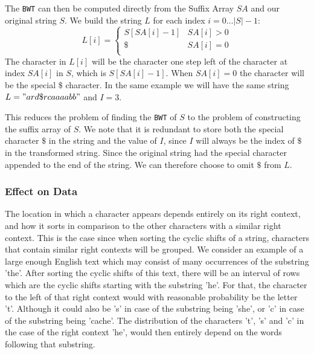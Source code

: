 \documentclass{article}
\begin{document}
The \texttt{BWT} can then be computed directly from the Suffix Array \(SA\) and our original string \(S\). We build the string \(L\) for each index \(i = 0 \dots |S|-1\):
\[
    L[i] = \begin{cases} 
        S[SA[i] - 1] & SA[i] > 0 \\
        \$ & SA[i] = 0 \\
   \end{cases}
\]
The character in \(L[i]\) will be the character one step left of the character at index \(SA[i]\) in \(S\), which is \(S[SA[i] - 1]\). When \(SA[i] = 0\) the character will be the special \(\$\) character. In the same example we will have the same string \(L = "ard\$rcaaaabb"\) and \(I = 3\).

This reduces the problem of finding the \texttt{BWT} of \(S\) to the problem of constructing the suffix array of \(S\). We note that it is redundant to store both the special character \(\$\) in the string and the value of \(I\), since \(I\) will always be the index of \(\$\) in the transformed string. Since the original string had the special character appended to the end of the string. We can therefore choose to omit \(\$\) from \(L\).


\subsubsection{Effect on Data}\label{sectionBWTEffectOnData}
The location in which a character appears depends entirely on its right context, and how it sorts in comparison to the other characters with a similar right context. This is the case since when sorting the cyclic shifts of a string, characters that contain similar right contexts will be grouped. We consider an example of a large enough English text which may consist of many occurrences of the substring 'the\textvisiblespace'. 
After sorting the cyclic shifts of this text, there will be an interval of rows which are the cyclic shifts starting with the substring 'he\textvisiblespace'. For that, the character to the left of that right context would with reasonable probability be the letter 't'. Although it could also be 's' in case of the substring being 'she\textvisiblespace', or 'c' in case of the substring being 'cache\textvisiblespace'.
The distribution of the characters 't', 's' and 'c' in the case of the right context 'he\textvisiblespace', would then entirely depend on the words following that substring. 
\end{document}
